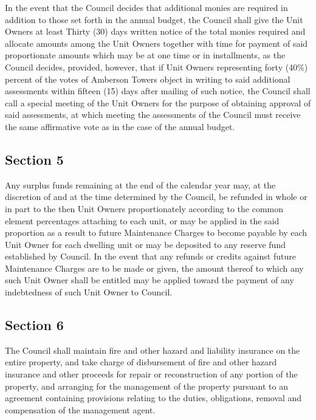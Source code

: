 \documentclass[
  14pt,
]{book}
\begin{document}
In the event that the Council decides that additional monies are required in addition to those set forth in the annual budget, the Council shall give the Unit Owners at least Thirty (30) days written notice of the total monies required and allocate amounts among the Unit Owners together with time for payment of said proportionate amounts which may be at one time or in installments, as the Council decides, provided, however, that if Unit Owners representing forty (40\%) percent of the votes of Amberson Towers object in writing to said additional assessments within fifteen (15) days after mailing of such notice, the Council shall call a special meeting of the Unit Owners for the purpose of obtaining approval of said assessments, at which meeting the assessments of the Council must receive the same affirmative vote as in the case of the annual budget.

\hypertarget{section-5-3}{%
\subsection*{Section 5}\label{section-5-3}}

Any surplus funds remaining at the end of the calendar year may, at the discretion of and at the time determined by the Council, be refunded in whole or in part to the then Unit Owners proportionately according to the common element percentages attaching to each unit, or may be applied in the said proportion as a result to future Maintenance Charges to become payable by each Unit Owner for each dwelling unit or may be deposited to any reserve fund established by Council. In the event that any refunds or credits against future Maintenance Charges are to be made or given, the amount thereof to which any such Unit Owner shall be entitled may be applied toward the payment of any indebtedness of such Unit Owner to Council.

\hypertarget{section-6-3}{%
\subsection*{Section 6}\label{section-6-3}}

The Council shall maintain fire and other hazard and liability insurance on the entire property, and take charge of disbursement of fire and other hazard insurance and other proceeds for repair or reconstruction of any portion of the property, and arranging for the management of the property pursuant to an agreement containing provisions relating to the duties, obligations, removal and compensation of the management agent.
\end{document}
